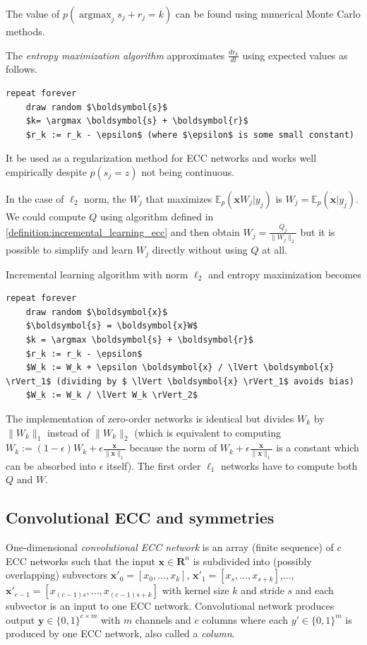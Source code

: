 \documentclass[oneside,english,logo]{amuthesis}
\DeclareMathOperator*{\argmax}{argmax}
\begin{document}
The value of $p(\argmax_j s_j+r_j=k)$ can be found using numerical Monte Carlo methods.
\begin{definition}
\label{paragraph:entropy_maximization}
The \textit{entropy maximization algorithm} approximates $\frac{d r_k}{d t}$ using expected values as follows.
\begin{lstlisting}
repeat forever
    draw random $\boldsymbol{s}$
    $k= \argmax \boldsymbol{s} + \boldsymbol{r}$
    $r_k := r_k - \epsilon$ (where $\epsilon$ is some small constant)
\end{lstlisting}
\end{definition}
It be used as a regularization method for ECC networks and works well empirically despite $p(s_j=z)$ not being continuous.


In the case of $\ell_2$ norm, the $W_j$ that maximizes $\mathbb{E}_p(\boldsymbol{x}W_j|y_j)$ is $W_j=\mathbb{E}_{p}(\boldsymbol{x}|y_j)$. We could compute $Q$ using algorithm defined in \ref{definition:incremental_learning_ecc} and then obtain $W_j=\frac{Q_j}{\lVert W_j \rVert_2}$ but it is possible to
simplify and learn $W_j$ directly without using $Q$ at all. 
\begin{definition}
Incremental learning algorithm with norm $\ell_2$ and entropy maximization becomes
\begin{lstlisting}
repeat forever
    draw random $\boldsymbol{x}$
    $\boldsymbol{s} = \boldsymbol{x}W$
    $k = \argmax \boldsymbol{s} + \boldsymbol{r}$
    $r_k := r_k - \epsilon$ 
    $W_k := W_k + \epsilon \boldsymbol{x} / \lVert \boldsymbol{x} \rVert_1$ (dividing by $ \lVert \boldsymbol{x} \rVert_1$ avoids bias)
    $W_k := W_k / \lVert W_k \rVert_2$
\end{lstlisting}
\end{definition}
The implementation of zero-order networks is identical but divides $W_k$ by $\lVert W_k \rVert_1$ instead of $\lVert W_k \rVert_2$ (which is equivalent to computing $W_k:=(1-\epsilon)W_k+\epsilon\frac{\boldsymbol{x}}{ \lVert \boldsymbol{x} \rVert_1}$ because the norm of $ W_k + \epsilon \frac{\boldsymbol{x}}{ \lVert \boldsymbol{x} \rVert_1}$ is a constant which can be absorbed into $\epsilon$ itself). The first order $\ell_1$ networks have to compute both $Q$ and $W$.
\subsection{Convolutional ECC and symmetries}
\begin{definition}
	One-dimensional \textit{convolutional ECC network} is an array (finite sequence) of $c$ ECC networks such that the input $\boldsymbol{x}\in \boldsymbol{R}^{n}$ is subdivided into (possibly overlapping) subvectors $\boldsymbol{x}'_0=[x_0,...,x_k]$,
	$\boldsymbol{x}'_1=[x_s,...,x_{s+k}]$,..., $\boldsymbol{x}'_{c-1}=[x_{(c-1)s},...,x_{(c-1)s+k}]$ with kernel size $k$ and stride $s$ and each subvector is an input to one ECC network. Convolutional network produces output $\boldsymbol{y}\in \{0,1\}^{c\times m}$ with $m$ channels and $c$ columns where each $y'\in \{0,1\}^m$ is produced by one ECC network, also called a \textit{column}.
\end{definition}
\end{document}

